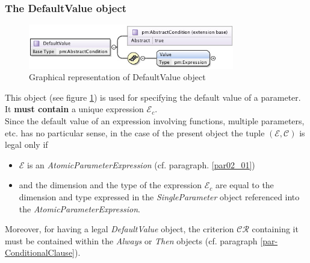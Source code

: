 \documentclass[a4paper,11pt] {ivoa}
\begin{document}
\subsubsection{The DefaultValue object}\label{par-DefaultValue}
\begin{figure}[htbp]
\begin{center}
\includegraphics[width=0.8\textwidth]{pictures/DefaultValue.jpg} 
\caption{Graphical representation of DefaultValue object}
\label{Pic-DefaultValue}
\end{center}
\end{figure}
This object (see figure \ref{Pic-DefaultValue}) is used for specifying the default value of a
parameter.\\
It {\bf must contain} a unique expression $\mathcal E_c$.\\
Since the default value of an expression involving functions, multiple parameters, etc. has no
particular sense, in the case of the present object the tuple $(\mathcal E, \mathcal C)$  is legal
only if
\begin{itemize}
\item $\mathcal E$ is an {\it AtomicParameterExpression} (cf. paragraph. \ref{par02_01}) \item and
the dimension and the type of the expression $\mathcal E_c$ are equal to the dimension and type
expressed in the {\it SingleParameter} object referenced into the {\it AtomicParameterExpression}.
\end{itemize}
Moreover, for having a legal {\it DefaultValue} object, the criterion $\mathcal{CR}$ containing it must be contained within 
the {\it Always} or {\it Then}  objects (cf. paragraph \ref{par-ConditionalClause}).
\end{document}
